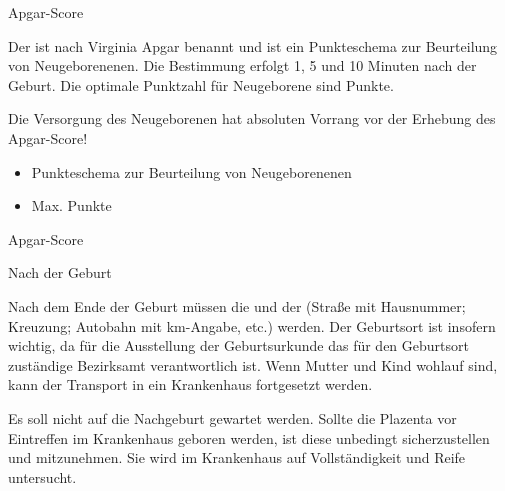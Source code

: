 \TextSlide
{Apgar-Score}
{Der  ist nach Virginia Apgar
benannt und ist ein Punkteschema zur Beurteilung von
Neugeborenenen. Die Bestimmung erfolgt 1, 5 und 10 Minuten
nach der Geburt. Die optimale Punktzahl für Neugeborene sind
 Punkte. 
\begin{Danger}
  \item Die Versorgung des Neugeborenen hat absoluten Vorrang 
  vor der Erhebung des Apgar-Score!
\end{Danger}
}
{
\begin{itemize}
  \item Punkteschema zur Beurteilung von 
  Neugeborenenen
  \item Max.  Punkte
\end{itemize}
}
{}
{}
{}



\TableWide
{Apgar-Score}%
{}%
{}%
{}%
{}%
{%
}%
{}%

\Text
{Nach der Geburt}%
{%
Nach dem Ende der Geburt müssen die  und der
 (Straße mit Hausnummer; Kreuzung; Autobahn
mit km-Angabe, etc.)  werden. Der
Geburtsort ist insofern wichtig, da für die Ausstellung der
Geburtsurkunde  das für den Geburtsort zuständige Bezirksamt
verantwortlich ist. Wenn Mutter und Kind wohlauf sind, kann
der Transport in ein Krankenhaus fortgesetzt werden.

Es soll nicht auf die Nachgeburt gewartet werden. Sollte die
Plazenta vor Eintreffen im Krankenhaus geboren werden, ist
diese unbedingt sicherzustellen und mitzunehmen. Sie wird im
Krankenhaus auf Vollständigkeit und Reife untersucht.
}%





